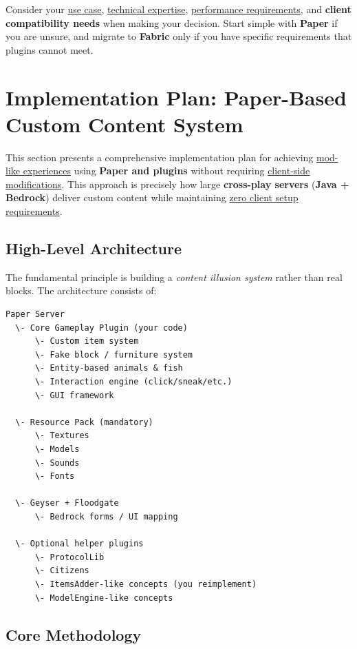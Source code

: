 \documentclass{article}
\begin{document}
Consider your \uline{use case}, \uline{technical expertise}, \uline{performance requirements}, and \textbf{client compatibility needs} when making your decision. Start simple with \textbf{Paper} if you are unsure, and migrate to \textbf{Fabric} only if you have specific requirements that plugins cannot meet.









\newpage
\section{Implementation Plan: Paper-Based Custom Content System}

This section presents a comprehensive implementation plan for achieving \uline{mod-like experiences} using \textbf{Paper and plugins} without requiring \uline{client-side modifications}. This approach is precisely how large \textbf{cross-play servers} (\textbf{Java + Bedrock}) deliver custom content while maintaining \uline{zero client setup requirements}.

\subsection{High-Level Architecture}

The fundamental principle is building a \textit{content illusion system} rather than real blocks. The architecture consists of:

\begin{verbatim}
Paper Server
  \- Core Gameplay Plugin (your code)
      \- Custom item system
      \- Fake block / furniture system
      \- Entity-based animals & fish
      \- Interaction engine (click/sneak/etc.)
      \- GUI framework
  
  \- Resource Pack (mandatory)
      \- Textures
      \- Models
      \- Sounds
      \- Fonts
  
  \- Geyser + Floodgate
      \- Bedrock forms / UI mapping
  
  \- Optional helper plugins
      \- ProtocolLib
      \- Citizens
      \- ItemsAdder-like concepts (you reimplement)
      \- ModelEngine-like concepts
\end{verbatim}

\subsection{Core Methodology}
\end{document}

